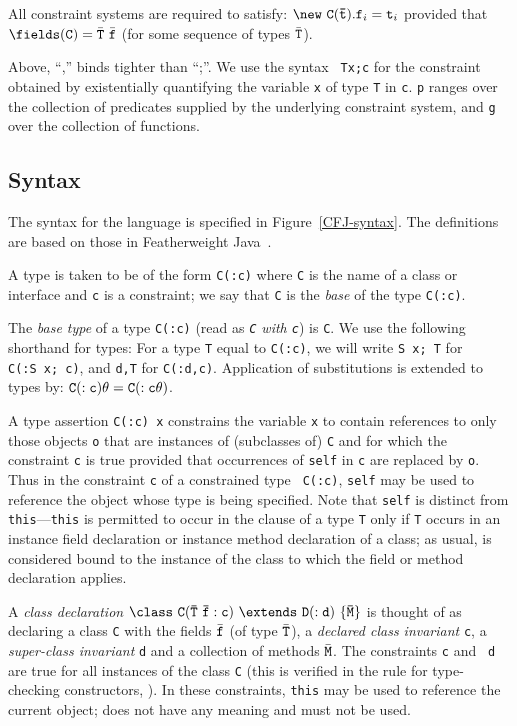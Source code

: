 All constraint systems are required to satisfy: $\new\ {\tt C(\bar{\tt
t})}.{\tt f}_i={\tt t}_i $ provided that $\fields({\tt C})=\bar{\tt
T}\ \bar{\tt f}$ (for some sequence of types $\bar{\tt T}$).

Above, ``,'' binds tighter than ``;''. We use the syntax {\tt
{\tt T\;x};\;c} for the constraint obtained by existentially quantifying the
variable {\tt x} of type {\tt T} in {\tt c}. {\tt p} ranges over
the collection of predicates supplied by the underlying constraint
system, and {\tt g} over the collection of functions.

\subsection{Syntax}

The syntax for the language is specified in Figure~\ref{CFJ-syntax}.
The definitions are based on those in Featherweight Java~\cite{FJ}. 

A type is taken to be of the form {\tt C(:c)} where {\tt C} is the
name of a class or interface and {\tt c} is a constraint; we say that
{\tt C} is the {\em base} of the type {\tt C(:c)}.

The {\em base type} of a type {\tt C(:c)} (read as {\em {\tt C} with
{\tt c}}) is {\tt C}.  We use the following shorthand for types: For a
type {\tt T} equal to {\tt C(:c)}, we will write {\tt S\ x; T} for
{\tt C(:S\ x; c)}, and {\tt d,T} for {\tt C(:d,c)}.
Application of substitutions is extended to
types by: ${\tt C(:c)\theta}={\tt C(:c\theta)}$.

A type assertion {\tt C(:c) x} constrains the variable {\tt x} to
contain references to only those objects {\tt o} that are instances of
(subclasses of) {\tt C} and for which the constraint {\tt c} is true
provided that occurrences of {\tt self} in {\tt c} are replaced by
{\tt o}. Thus in the constraint {\tt c} of a constrained type {\tt
C(:c)}, {\tt self} may be used to reference the object whose type is
being specified. Note that {\tt self} is distinct from
{\tt this}---{\tt this} is permitted to occur in the clause of
a type {\tt T} only
if {\tt T} occurs in an instance field declaration or instance method
declaration of a class; as usual, \this{} is considered bound to the
instance of the class to which the field or method declaration
applies.

A {\em class declaration} $\tt\class \ C(\bar{T}\ \bar{f}:c)\ \extends\ D(:d)\
\{\bar{M}\}$ is thought of as declaring a class {\tt C} with the
fields $\bar{\tt f}$ (of type $\bar{\tt T}$), a {\em declared class
invariant} {\tt c}, a {\em super-class invariant} {\tt d} and a
collection of methods $\bar{\tt M}$. The constraints {\tt c} and {\tt
d} are true for all instances of the class {\tt C} (this is verified
in the rule for type-checking constructors, \rn{T-New}).  In these
constraints, {\tt this} may be used to reference the current object;
\self{} does not have any meaning and must not be used.

